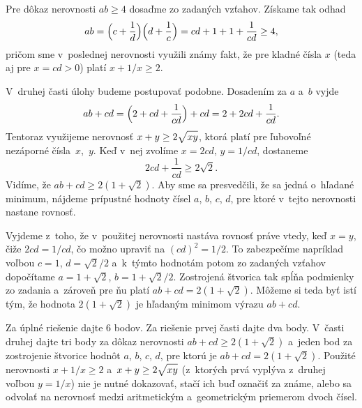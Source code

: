 {%
Pre dôkaz nerovnosti $ab\ge4$ dosaďme zo zadaných vzťahov.
Získame tak odhad
$$
ab = \Bigl(c+ \frac{1}{d}\Bigr)\Bigl(d+ \frac{1}{c}\Bigr)
= cd + 1 + 1 + \frac{1}{cd} \ge 4,
$$
pričom sme v~poslednej nerovnosti využili známy fakt, že pre kladné
čísla $x$ (teda aj pre $x=cd > 0$) platí $x + 1/x \ge 2$.

V~druhej časti úlohy budeme postupovať podobne. Dosadením za $a$ a~$b$ vyjde
$$
ab + cd = \Bigl( 2 + cd + \frac{1}{cd}\Bigr) + cd = 2 + 2cd +\frac{1}{cd}.
$$
Tentoraz využijeme nerovnosť $x+y \ge 2\sqrt{xy\mathstrut}$, ktorá platí pre
ľubovoľné nezáporné čísla~$x$,~$y$. Keď v~nej zvolíme $x = 2cd$, $y =1/cd$,
dostaneme
$$
2cd + \frac{1}{cd} \ge 2\sqrt{2}.
$$
Vidíme, že $ab + cd \ge 2(1+\sqrt{2})$. Aby sme sa presvedčili, že
sa jedná o~hľadané minimum, nájdeme prípustné hodnoty čísel
$a$, $b$, $c$, $d$, pre ktoré v~tejto nerovnosti nastane rovnosť.

Vyjdeme z~toho, že v~použitej nerovnosti nastáva rovnosť práve vtedy, keď
${x=y}$, čiže $2cd = 1/cd$, čo možno upraviť na $(cd)^2 = 1/2$. To
zabezpečíme napríklad voľbou
$c = 1$, $d = \sqrt{2}/2$ a~k~týmto hodnotám potom zo zadaných vzťahov
dopočítame ${a=1+\sqrt{2}}$, $b = 1+\sqrt{2}/2$. Zostrojená štvorica
tak spĺňa podmienky zo zadania a~zároveň pre ňu platí $ab+cd =
2(1+\sqrt{2})$. Môžeme si teda byť istí tým, že hodnota $2(1+\sqrt{2})$ je
hľadaným minimom výrazu $ab+cd$.


\nobreak\medskip\petit\noindent
Za úplné riešenie dajte 6 bodov.
Za riešenie prvej časti dajte dva body.
V~časti druhej dajte tri body za dôkaz nerovnosti $ab + cd \ge
2(1+\sqrt{2})$ a~jeden bod za zostrojenie štvorice hodnôt $a$, $b$, $c$, $d$, pre
ktorú je $ab + cd = 2(1+\sqrt{2})$.
Použité nerovnosti $x+1/x\ge2$ a~$x+y\ge2\sqrt{xy\mathstrut}$ (z~ktorých prvá
vyplýva z~druhej voľbou $y=1/x$) nie je nutné dokazovať, stačí ich buď označiť
za známe, alebo sa odvolať na nerovnosť medzi aritmetickým a~geometrickým
priemerom dvoch čísel.
\endpetit
\bigbreak}

